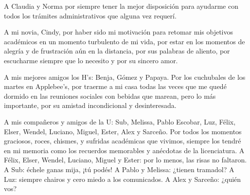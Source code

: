 A Claudia y Norma por siempre tener la mejor disposición para ayudarme 
con todos los trámites administrativos que alguna vez requerí. 

A mi novia, Cindy, por haber sido mi motivación para retomar mis 
objetivos académicos en un momento turbulento de mi vida, 
por estar en los momentos de alegría y de frustración aún en la distancia, 
por sus palabras de aliento, por escucharme siempre que lo necesito y 
por su sincero amor.

A mis mejores amigos los H's: Benja, Gómez y Papaya. Por los cuchubales de
los martes en Applebee's, por traerme a mi casa todas las veces que 
me quedé dormido en las reuniones sociales con bebidas que marean, 
pero lo más importante, por su amistad 
incondicional y desinteresada.

A mis compañeros y amigos de la U: Sub, Melissa, Pablo Escobar, 
Luz, Félix, Elser, Wendel, Luciano, Miguel, Ester,  Alex y Sarceño.
Por todos los momentos graciosos, roces, chismes, y sufridas académicas 
que vivimos, siempre los tendré en mi memoria como los recuerdos memorables y 
anécdotas de la licenciatura. A Félix, Elser, Wendel, Luciano, Miguel y Ester: 
por lo menos, las risas no faltaron. A Sub: échele ganas mija, ¡tú podés! 
A Pablo y Melissa: ¿tienen tramadol? A Luz: siempre chairos y cero miedo 
a los comunicados. A Alex y Sarceño: ¿quién vos? 
% 